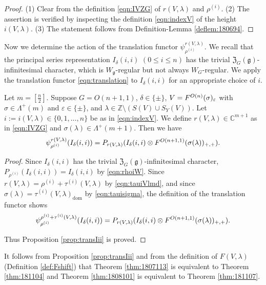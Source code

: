 \begin{proof}
(1)\enspace
 Clear from the definition \eqref{eqn:IVZG}
 of $r(V,\lambda)$ and $\rho^{(i)}$.  
(2)\enspace
The assertion is verified by inspecting
 the definition \eqref{eqn:indexV} of the height $i(V,\lambda)$.  (3)\enspace
The statement follows from Definition-Lemma \ref{deflem:180694}.  
\end{proof}


Now we determine the action of the translation functor
 $\psi_{\rho^{(i)}}^{r(V,\lambda)}$.  
We recall that the principal series representation
 $I_{\delta}(i,i)$ $(0 \le i \le n)$
 has the trivial ${\mathfrak{Z}}_G({\mathfrak{g}})$-infinitesimal character,
 which is $W_{\mathfrak{g}}$-regular
 but not always $W_G$-regular.  
We apply the translation functor \eqref{eqn:translation} to $I_{\delta}(i,i)$
 for an appropriate choice of $i$.  

\begin{proposition}
\label{prop:transIii}
Let $m=[\frac n 2]$.  
Suppose $G=O(n+1,1)$, 
 $\delta \in \{\pm\}$, 
 $V=F^{{O(n)}}({\sigma})_{\varepsilon}$
 with $\sigma \in \Lambda^+(m)$ and $\varepsilon \in \{\pm\}$, 
 and $\lambda \in {\mathbb{Z}} \setminus (S(V) \cup S_Y(V))$.  
Let $i:=i(V,\lambda) \in \{0,1,\ldots,n\}$ be as in \eqref{eqn:indexV}. 
We define $r(V, \lambda)\in {\mathbb{C}}^{m+1}$ as in \eqref{eqn:IVZG}
 and $\sigma(\lambda)\in \Lambda^+(m+1)$.  
Then we have 
\[
  \psi_{\rho^{(i)}}^{r(V,\lambda)}(I_{\delta}(i,i)) 
= P_{r(V,\lambda)}(I_{\delta}(i,i)  
  \otimes 
  F^{{O(n+1,1)}}({\sigma(\lambda)})_{+,+}).  
\]
\end{proposition}
\begin{proof}
Since $I_{\delta}(i,i)$ has the trivial ${\mathfrak{Z}}_G({\mathfrak{g}})$-infinitesimal character,
 $P_{\rho^{(i)}}(I_{\delta}(i,i))=I_{\delta}(i,i)$
 by \eqref{eqn:rhoiW}.  
Since $r(V,\lambda)=\rho^{(i)} + \tau^{(i)}(V,\lambda)$
 by \eqref{eqn:tauiVlmd}, 
 and since $\sigma(\lambda)=\tau^{(i)}(V,\lambda)_{\operatorname{dom}}$ by
 \eqref{eqn:tauisigma}, 
 the definition of the translation functor shows 
\[
  \psi_{\rho^{(i)}}^{\rho^{(i)} + \tau^{(i)}(V,\lambda)}(I_{\delta}(i,i)) 
= P_{r(V,\lambda)}(I_{\delta}(i,i) \otimes F^{{O(n+1,1)}}({\sigma(\lambda)})_{+,+}).
\]

Thus Proposition \ref{prop:transIii} is proved.  
\end{proof}

It follows from Proposition \ref{prop:transIii}
 and from the definition of $F(V,\lambda)$
(Definition \ref{def:Fshift})
 that Theorem \ref{thm:1807113}
 is equivalent to Theorem \ref{thm:181104}
 and Theorem \ref{thm:1808101} is equivalent to Theorem \ref{thm:181107}.  



